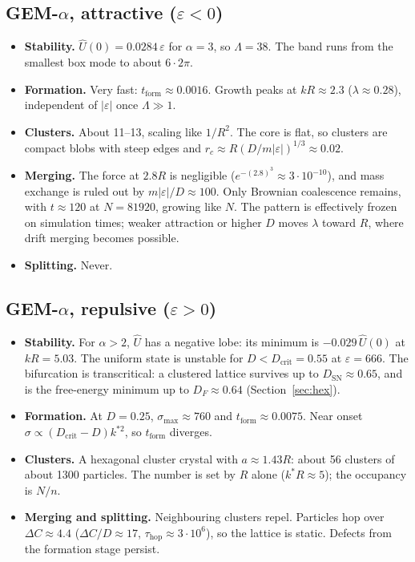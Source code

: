 \documentclass[11pt]{article}
\newcommand{\Uh}{\hat U}
\newcommand{\tf}{t_{\mathrm{form}}}
\begin{document}
\subsection{\texorpdfstring{GEM-$\alpha$, attractive ($\varepsilon<0$)}{GEM-alpha, attractive}}
\begin{itemize}
  \item \textbf{Stability.} $\Uh(0)=0.0284\,\varepsilon$ for $\alpha=3$, so
        $\Lambda=38$. The band runs from the smallest box mode to about
        $6\cdot2\pi$.
  \item \textbf{Formation.} Very fast: $\tf\approx0.0016$. Growth peaks at
        $kR\approx2.3$ ($\lambda\approx0.28$), independent of $|\varepsilon|$
        once $\Lambda\gg1$.
  \item \textbf{Clusters.} About 11--13, scaling like $1/R^2$. The core is flat,
        so clusters are compact blobs with steep edges and
        $r_c\approx R(D/m|\varepsilon|)^{1/3}\approx0.02$.
  \item \textbf{Merging.} The force at $2.8R$ is negligible
        ($e^{-(2.8)^3}\approx3\cdot10^{-10}$), and mass exchange is ruled out
        by $m|\varepsilon|/D\approx100$. Only Brownian coalescence remains,
        with $t\approx120$ at $N=81920$, growing like $N$. The pattern is
        effectively frozen on simulation times; weaker attraction or higher
        $D$ moves $\lambda$ toward $R$, where drift merging becomes possible.
  \item \textbf{Splitting.} Never.
\end{itemize}

\subsection{\texorpdfstring{GEM-$\alpha$, repulsive ($\varepsilon>0$)}{GEM-alpha, repulsive}}
\begin{itemize}
  \item \textbf{Stability.} For $\alpha>2$, $\Uh$ has a negative lobe: its
        minimum is $-0.029\,\Uh(0)$ at $kR=5.03$. The uniform state is
        unstable for $D<D_{\mathrm{crit}}=0.55$ at $\varepsilon=666$.
        The bifurcation is transcritical: a clustered lattice survives up to
        $D_{\mathrm{SN}}\approx0.65$, and is the free-energy minimum up to
        $D_F\approx0.64$ (Section~\ref{sec:hex}).
  \item \textbf{Formation.} At $D=0.25$, $\sigma_{\max}\approx760$ and
        $\tf\approx0.0075$. Near onset $\sigma\propto(D_{\mathrm{crit}}-D)k^{*2}$,
        so $\tf$ diverges.
  \item \textbf{Clusters.} A hexagonal cluster crystal with $a\approx1.43R$:
        about 56 clusters of about 1300 particles. The number is set by $R$
        alone ($k^*R\approx5$); the occupancy is $N/n$.
  \item \textbf{Merging and splitting.} Neighbouring clusters repel. Particles
        hop over $\Delta C\approx4.4$ ($\Delta C/D\approx17$, $\tau_{\mathrm{hop}}\approx3\cdot10^6$),
        so the lattice is static. Defects from the formation stage persist.
\end{itemize}
\end{document}

